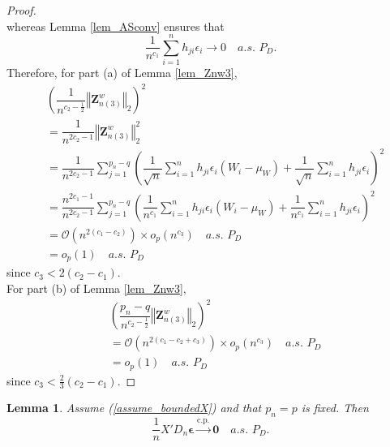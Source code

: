 \documentclass[ejs,authoryear,linksfromyear]{imsart}
\newcommand{\sumin}{\sum_{i=1}^n} %
\newcommand{\CONV}[1]{\stackrel{\text{#1}}{\longrightarrow}} %
\newcommand{\znwc}{\bm{Z}_{n(3)}^w}
\numberwithin{equation}{section}
\theoremstyle{plain}
\newtheorem{lem}{Lemma}[section]
\begin{document}
\begin{proof}
$$	$$
	whereas Lemma \ref{lem_ASconv} ensures that
	$$
	\dfrac{1}{n^{c_1}} \sumin h_{ji} \epsilon_i  
	\to 0 \quad a.s. \,\, P_D.
	$$
	Therefore, for part (a) of Lemma \ref{lem_Znw3},
	\begin{align*}
	&\left( 
		\dfrac{1}{n^{c_2 - \frac{1}{2}}}
		\left\Vert \znwc \right\Vert _2
	\right)^2 \\
	&=  \dfrac{1}{n^{2 c_2 - 1}}
		\left\Vert \znwc \right\Vert^2 _2 \\
	&= \dfrac{1}{n^{2 c_2 - 1}}
	\sum_{j=1}^{p_n-q}
	\left(
		\dfrac{1}{\sqrt{n}} \sumin h_{ji} \epsilon_i (W_i - \mu_W)
		+ \dfrac{1}{\sqrt{n}} \sumin h_{ji} \epsilon_i 
	\right)^2 \\
	&= \dfrac{n^{2 c_1 - 1}}{n^{2 c_2 - 1}}
	\sum_{j=1}^{p_n-q}
	\left(
		\dfrac{1}{n^{c_1}} \sumin h_{ji} \epsilon_i (W_i - \mu_W)
		+ \dfrac{1}{n^{c_1}} \sumin h_{ji} \epsilon_i 
	\right)^2 \\
	&= \mathcal{O} \left( n^{2(c_1 - c_2)} \right)
	\times o_p \left( n^{c_3} \right) \quad a.s. \,\, P_D \\
	&= o_p(1) \quad a.s. \,\, P_D 
	\end{align*}
	since $c_3 < 2(c_2 - c_1)$. \\
	
	For part (b) of Lemma \ref{lem_Znw3},
	\begin{align*}
	&\left( 
	\dfrac{p_n - q}{n^{c_2 - \frac{1}{2}}}
	\left\Vert \znwc \right\Vert _2
	\right)^2 \\
	&= \mathcal{O} \left( n^{2(c_1 - c_2 + c_3)} \right)
	\times o_p \left( n^{c_3} \right) \quad a.s. \,\, P_D \\
	&= o_p(1) \quad a.s. \,\, P_D 
	\end{align*}
	since $c_3 < \frac{2}{3}(c_2 - c_1)$.
\end{proof}

\begin{lem} \label{lem_X'DnEps}
	Assume (\ref{assume_boundedX}) and that $p_n = p$ is fixed. Then
	$$
	\dfrac{1}{n} X' D_n \bm{\epsilon}
	\CONV{c.p.} \bm{0} 
	\quad a.s. \,\, P_D.
	$$
\end{lem}
\end{document}
